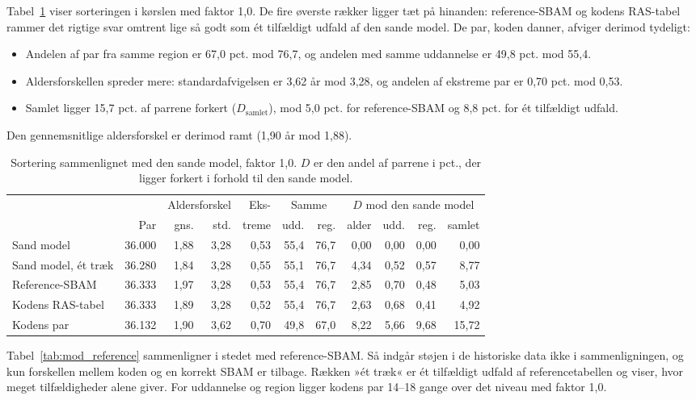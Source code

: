 \documentclass[11pt,a4paper]{article}
\begin{document}
Tabel~\ref{tab:sortering10} viser sorteringen i kørslen med faktor 1,0. De fire øverste rækker
ligger tæt på hinanden: reference-SBAM og kodens RAS-tabel rammer det rigtige svar omtrent lige så
godt som ét tilfældigt udfald af den sande model. De par, koden danner, afviger derimod tydeligt:

\begin{itemize}
\item Andelen af par fra samme region er 67,0 pct. mod 76,7, og andelen med samme uddannelse er
49,8 pct. mod 55,4.
\item Aldersforskellen spreder mere: standardafvigelsen er 3,62 år mod 3,28, og andelen af ekstreme
par er 0,70 pct. mod 0,53.
\item Samlet ligger 15,7 pct. af parrene forkert ($D_{\text{samlet}}$), mod 5,0 pct. for
reference-SBAM og 8,8 pct. for ét tilfældigt udfald.
\end{itemize}

Den gennemsnitlige aldersforskel er derimod ramt (1,90 år mod 1,88).

\begin{table}[ht]
\centering
\caption{Sortering sammenlignet med den sande model, faktor 1,0. $D$ er den andel af parrene i pct.,
der ligger forkert i forhold til den sande model.}
\label{tab:sortering10}
\small
\begin{tabular}{@{}lrrrrrrrrrr@{}}
\toprule
 & & \multicolumn{2}{c}{Aldersforskel} & Eks- & \multicolumn{2}{c}{Samme} & \multicolumn{4}{c}{$D$ mod den sande model} \\
\cmidrule(lr){3-4}\cmidrule(lr){6-7}\cmidrule(l){8-11}
 & Par & gns. & std. & treme & udd. & reg. & alder & udd. & reg. & samlet \\
\midrule
Sand model & 36.000 & 1,88 & 3,28 & 0,53 & 55,4 & 76,7 & 0,00 & 0,00 & 0,00 & 0,00 \\
Sand model, ét træk & 36.280 & 1,84 & 3,28 & 0,55 & 55,1 & 76,7 & 4,34 & 0,52 & 0,57 & 8,77 \\
Reference-SBAM & 36.333 & 1,97 & 3,28 & 0,53 & 55,4 & 76,7 & 2,85 & 0,70 & 0,48 & 5,03 \\
Kodens RAS-tabel & 36.333 & 1,89 & 3,28 & 0,52 & 55,4 & 76,7 & 2,63 & 0,68 & 0,41 & 4,92 \\
Kodens par & 36.132 & 1,90 & 3,62 & 0,70 & 49,8 & 67,0 & 8,22 & 5,66 & 9,68 & 15,72 \\
\bottomrule
\end{tabular}
\end{table}

Tabel~\ref{tab:mod_reference} sammenligner i stedet med reference-SBAM. Så indgår støjen i de
historiske data ikke i sammenligningen, og kun forskellen mellem koden og en korrekt SBAM er tilbage.
Rækken »ét træk« er ét tilfældigt udfald af referencetabellen og viser, hvor meget tilfældigheder
alene giver. For uddannelse og region ligger kodens par 14--18 gange over det niveau med faktor 1,0.
\end{document}
